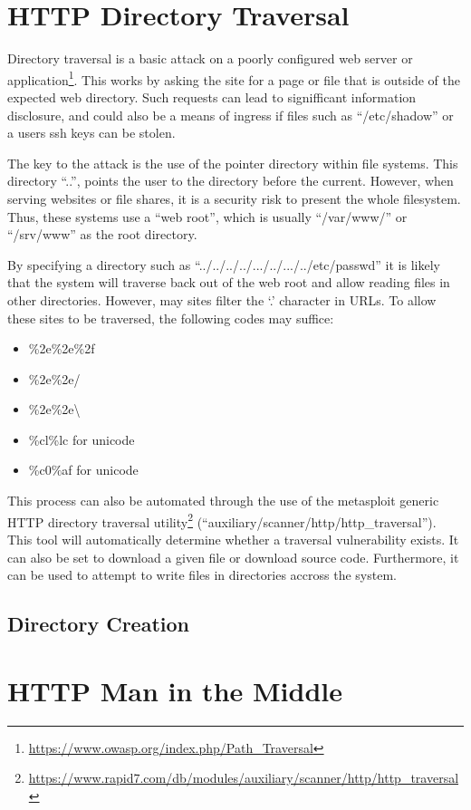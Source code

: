 	\section{HTTP Directory Traversal}
		Directory traversal is a basic attack on a poorly configured web server or application\footnote{\url{https://www.owasp.org/index.php/Path\_Traversal}}. 
		This works by asking the site for a page or file that is outside of the expected web directory. 
		Such requests can lead to signifficant information disclosure, and could also be a means of ingress if files such as ``/etc/shadow'' or a users ssh keys can be stolen. 

		The key to the attack is the use of the pointer directory within file systems. 
		This directory ``..'', points the user to the directory before the current. 
		However, when serving websites or file shares, it is a security risk to present the whole filesystem. 
		Thus, these systems use a ``web root'', which is usually ``/var/www/'' or ``/srv/www'' as the root directory. 

		By specifying a directory such as ``../../../../.../../.../../etc/passwd'' it is likely that the system will traverse back out of the web root and allow reading files in other directories. 
		However, may sites filter the `.' character in URLs. 
		To allow these sites to be traversed, the following codes may suffice:
		\begin{itemize}
			\item \%2e\%2e\%2f
			\item \%2e\%2e/
			\item \%2e\%2e\textbackslash
			\item \%cl\%lc for unicode
			\item \%c0\%af for unicode
		\end{itemize}

		This process can also be automated through the use of the metasploit generic HTTP directory traversal 
		utility\footnote{\url{https://www.rapid7.com/db/modules/auxiliary/scanner/http/http_traversal}} 
		(``auxiliary/scanner/http/http\_traversal'').
		This tool will automatically determine whether a traversal vulnerability exists. 
		It can also be set to download a given file or download source code. 
		Furthermore, it can be used to attempt to write files in directories accross the system. 
		\subsection{Directory Creation}
	\section{HTTP Man in the Middle}
